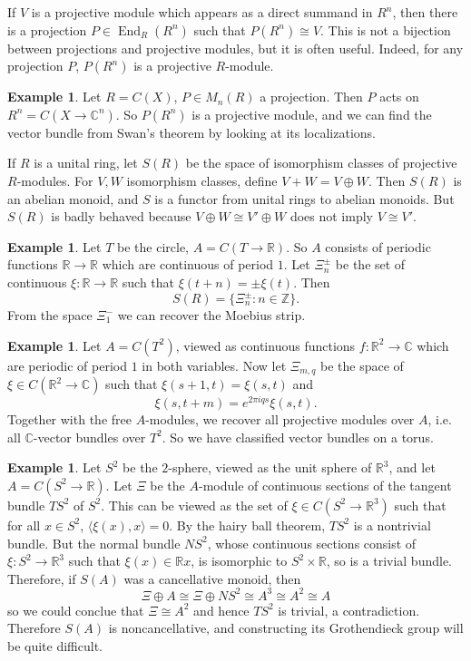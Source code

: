 \documentclass[12pt]{report}
\newcommand{\ZZ}{\mathbb{Z}}
\newcommand{\RR}{\mathbb{R}}
\newcommand{\CC}{\mathbb{C}}
\newcommand{\End}{\operatorname{End}}
\theoremstyle{definition}
\newtheorem{example}[theorem]{Example}
\begin{document}
    If $V$ is a projective module which appears as a direct summand in $R^n$, then there is a projection $P \in \End_R(R^n)$ such that $P(R^n) \cong V$. This is not a bijection between projections and projective modules, but it is often useful. Indeed, for any projection $P$, $P(R^n)$ is a projective $R$-module.
\begin{example}
    Let $R = C(X)$, $P \in M_n(R)$ a projection. Then $P$ acts on $R^n = C(X \to \CC^n)$. So $P(R^n)$ is a projective module, and we can find the vector bundle from Swan's theorem by looking at its localizations.
\end{example}
    If $R$ is a unital ring, let $S(R)$ be the space of isomorphism classes of projective $R$-modules. For $V,W$ isomorphism classes, define $V + W = V \oplus W$. Then $S(R)$ is an abelian monoid, and $S$ is a functor from unital rings to abelian monoids. But $S(R)$ is badly behaved because $V \oplus W \cong V' \oplus W$ does not imply $V \cong V'$.
\begin{example}
    Let $T$ be the circle, $A = C(T \to \RR)$. So $A$ consists of periodic functions $\RR \to \RR$ which are continuous of period $1$. Let $\Xi_n^\pm$ be the set of continuous $\xi: \RR \to \RR$ such that $\xi(t+n) = \pm \xi(t)$. Then
    $$S(R) = \{\Xi_n^\pm: n \in \ZZ\}.$$
    From the space $\Xi_1^-$ we can recover the Moebius strip.
\end{example}
\begin{example}
    Let $A = C(T^2)$, viewed as continuous functions $f: \RR^2 \to \CC$ which are periodic of period $1$ in both variables. Now let $\Xi_{m,q}$ be the space of $\xi \in C(\RR^2 \to \CC)$ such that $\xi(s + 1, t) = \xi(s, t)$ and
    $$\xi(s, t+m) = e^{2\pi iqs} \xi(s, t).$$
    Together with the free $A$-modules, we recover all projective modules over $A$, i.e. all $\CC$-vector bundles over $T^2$. So we have classified vector bundles on a torus.
\end{example}
\begin{example}
    Let $S^2$ be the $2$-sphere, viewed as the unit sphere of $\RR^3$, and let $A = C(S^2 \to \RR)$. Let $\Xi$ be the $A$-module of continuous sections of the tangent bundle $TS^2$ of $S^2$. This can be viewed as the set of $\xi \in C(S^2 \to \RR^3)$ such that for all $x \in S^2$, $\langle \xi(x), x\rangle = 0$. By the hairy ball theorem, $TS^2$ is a nontrivial bundle. But the normal bundle $NS^2$, whose continuous sections consist of $\xi: S^2 \to \RR^3$ such that $\xi(x) \in \RR x$, is isomorphic to $S^2 \times \RR$, so is a trivial bundle. Therefore, if $S(A)$ was a cancellative monoid, then
    $$\Xi \oplus A \cong \Xi \oplus NS^2 \cong A^3 \cong A^2 \cong A$$
    so we could conclue that $\Xi \cong A^2$ and hence $TS^2$ is trivial, a contradiction. Therefore $S(A)$ is noncancellative, and constructing its Grothendieck group will be quite difficult.
\end{example}
\end{document}
